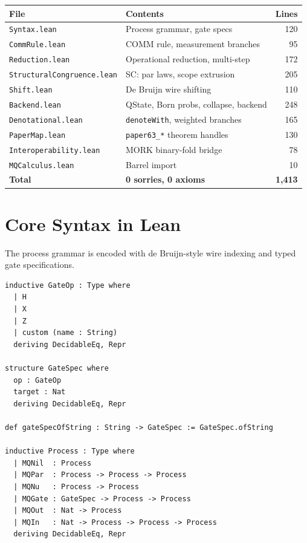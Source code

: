 \documentclass[11pt]{article}
\begin{document}
\begin{center}
\small
\begin{tabular}{llr}
\toprule
\textbf{File} & \textbf{Contents} & \textbf{Lines} \\
\midrule
\texttt{Syntax.lean} & Process grammar, gate specs & 120 \\
\texttt{CommRule.lean} & COMM rule, measurement branches & 95 \\
\texttt{Reduction.lean} & Operational reduction, multi-step & 172 \\
\texttt{StructuralCongruence.lean} & SC: par laws, scope extrusion & 205 \\
\texttt{Shift.lean} & De Bruijn wire shifting & 110 \\
\texttt{Backend.lean} & QState, Born probs, collapse, backend & 248 \\
\texttt{Denotational.lean} & \texttt{denoteWith}, weighted branches & 165 \\
\texttt{PaperMap.lean} & \texttt{paper63\_*} theorem handles & 130 \\
\texttt{Interoperability.lean} & MORK binary-fold bridge & 78 \\
\texttt{MQCalculus.lean} & Barrel import & 10 \\
\midrule
\textbf{Total} & \textbf{0 sorries, 0 axioms} & \textbf{1{,}413} \\
\bottomrule
\end{tabular}
\end{center}

\section{Core Syntax in Lean}
The process grammar is encoded with de Bruijn-style wire indexing and typed gate specifications.

\begin{lstlisting}[caption={Process and gate syntax (from \texttt{Syntax.lean})}]
inductive GateOp : Type where
  | H
  | X
  | Z
  | custom (name : String)
  deriving DecidableEq, Repr

structure GateSpec where
  op : GateOp
  target : Nat
  deriving DecidableEq, Repr

def gateSpecOfString : String -> GateSpec := GateSpec.ofString

inductive Process : Type where
  | MQNil  : Process
  | MQPar  : Process -> Process -> Process
  | MQNu   : Process -> Process
  | MQGate : GateSpec -> Process -> Process
  | MQOut  : Nat -> Process
  | MQIn   : Nat -> Process -> Process -> Process
  deriving DecidableEq, Repr
\end{lstlisting}
\end{document}
